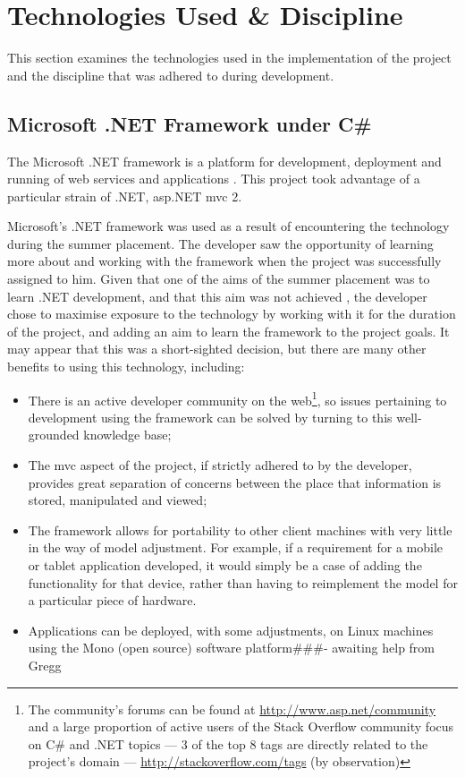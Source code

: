 \documentclass{l4proj}
\newcommand{\revisit}{\#\#\#}
\begin{document}
\section{Technologies Used \& Discipline}
This section examines the technologies used in the implementation of the project and the discipline that was adhered to during development.

\subsection{Microsoft .NET Framework under C\#}
The Microsoft .NET framework is a platform for development, deployment and running of web services and applications \cite{whatIsDotNet}. This project took advantage of a particular strain of .NET, \gls{asp}.NET \gls{mvc} 2.  

Microsoft's .NET framework was used as a result of encountering the technology during the summer placement.  The developer saw the opportunity of learning more about and working with the framework when the project was successfully assigned to him.  Given that one of the aims of the summer placement was to learn .NET development, and that this aim was not achieved \cite{summerPlacementReport}, the developer chose to maximise exposure to the technology by working with it for the duration of the project, and adding an aim to learn the framework to the project goals.  It may appear that this was a short-sighted decision, but there are many other benefits to using this technology, including:
\begin{itemize}
	\item There is an active developer community on the web\footnote{The community's forums can be found at \url{http://www.asp.net/community} and a large proportion of active users of the Stack Overflow community focus on C\# and .NET topics --- 3 of the top 8 tags are directly related to the project's domain --- \url{http://stackoverflow.com/tags} (by observation)}, so issues pertaining to development using the framework can be solved by turning to this well-grounded knowledge base;
	\item The \gls{mvc} aspect of the project, if strictly adhered to by the developer, provides great separation of concerns between the place that information is stored, manipulated and viewed;
	\item The framework allows for portability to other client machines with very little in the way of model adjustment. For example, if a requirement for a mobile or tablet application developed, it would simply be a case of adding the functionality for that device, rather than having to reimplement the model for a particular piece of hardware.
	\item Applications can be deployed, with some adjustments, on Linux machines using the Mono (open source) software platform\revisit - awaiting help from Gregg
\end{itemize}
\end{document}
